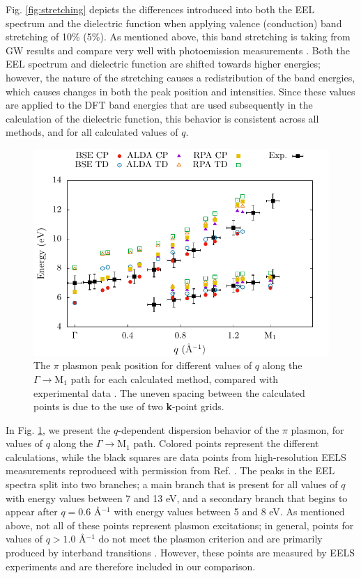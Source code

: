 \documentclass[aps,prb,10pt,showpacs,superscriptaddress,twocolumn,notitlepage]{revtex4-1}
\begin{document}
Fig. \ref{fig:stretching} depicts the differences introduced into both the EEL
spectrum and the dielectric function when applying valence (conduction) band
stretching of 10\% (5\%). As mentioned above, this band stretching is taking
from GW results \cite{olevano} and compare very well with photoemission
measurements \cite{heskePRB99, marinopoulosPRB04}. Both the EEL spectrum and
dielectric function are shifted towards higher energies; however, the nature of
the stretching causes a redistribution of the band energies, which causes
changes in both the peak position and intensities. Since these values are
applied to the DFT band energies that are used subsequently in the calculation
of the dielectric function, this behavior is consistent across all methods, and
for all calculated values of $q$.

\begin{figure}[b]
\includegraphics[width=\linewidth]{fig04}
\caption{The $\pi$ plasmon peak position for different values
of $q$ along the $\Gamma \rightarrow \mathrm{M}_{1}$ path for each calculated
method, compared with experimental data \cite{liouPRB15}. The uneven spacing
between the calculated points is due to the use of two \textbf{k}-point grids.}
\label{fig:gm-dispersion}
\end{figure}

In Fig. \ref{fig:gm-dispersion}, we present the $q$-dependent dispersion
behavior of the $\pi$ plasmon, for values of $q$ along the $\Gamma \rightarrow
\mathrm{M}_{1}$ path. Colored points represent the different calculations, while
the black squares are data points from high-resolution EELS measurements
reproduced with permission from Ref. . The peaks in the
EEL spectra split into two branches; a main branch that is present for all
values of $q$ with energy values between 7 and 13 eV, and a secondary branch
that begins to appear after $q = 0.6$ \r{A}$^{-1}$ with energy values between 5
and 8 eV. As mentioned above, not all of these points represent plasmon
excitations; in general, points for values of $q > 1.0$ \r{A}$^{-1}$ do not meet
the plasmon criterion and are primarily produced by interband transitions
\cite{marinopoulosPRB04}. However, these points are measured by EELS experiments
and are therefore included in our comparison.
\end{document}
